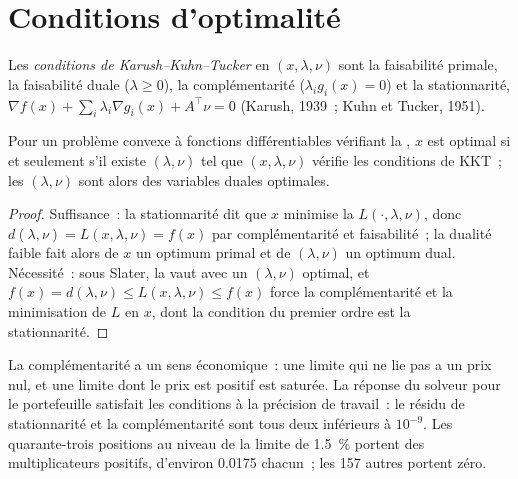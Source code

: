 \section{Conditions d'optimalité}

\begin{definition}\label{def:qm:convex-optimisation:kkt}
Les \emph{conditions de Karush--Kuhn--Tucker} en $(x, \lambda, \nu)$ sont la faisabilité primale, la faisabilité duale ($\lambda \ge 0$), la complémentarité
($\lambda_ig_i(x) = 0$) et la stationnarité, $\nabla f(x) + \sum_i\lambda_i\nabla g_i(x) + A^\top\nu = 0$ (Karush, 1939~; Kuhn et Tucker, 1951).
\end{definition}

\begin{theorem}\label{thm:qm:convex-optimisation:kkt}
Pour un problème convexe à fonctions différentiables vérifiant la , $x$ est optimal si et seulement s'il existe $(\lambda, \nu)$ tel que $(x, \lambda, \nu)$ vérifie
les conditions de KKT~; les $(\lambda, \nu)$ sont alors des variables duales optimales.
\end{theorem}

\begin{proof}
Suffisance~: la stationnarité dit que $x$ minimise la  $L(\cdot, \lambda, \nu)$, donc $d(\lambda, \nu) = L(x, \lambda, \nu) = f(x)$ par complémentarité et
faisabilité~; la dualité faible fait alors de $x$ un optimum primal et de $(\lambda, \nu)$ un optimum dual. Nécessité~: sous Slater, la  vaut avec un $(\lambda, \nu)$ optimal, et
$f(x) = d(\lambda, \nu) \le L(x, \lambda, \nu) \le f(x)$ force la complémentarité et la minimisation de $L$ en $x$, dont la condition du premier ordre est la stationnarité.
\end{proof}

La complémentarité a un sens économique~: une limite qui ne lie pas a un prix nul, et une limite dont le prix est positif est saturée. La réponse du solveur pour le portefeuille satisfait les
conditions à la précision de travail~: le résidu de stationnarité et la complémentarité sont tous deux inférieurs à $10^{-9}$. Les quarante-trois positions au niveau de la limite de 1.5~\% portent des multiplicateurs positifs,
d'environ 0.0175 chacun~; les 157 autres portent zéro.

